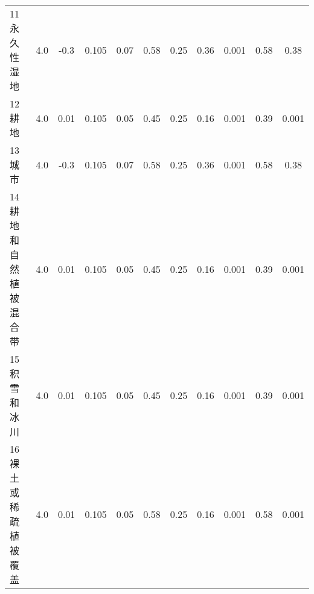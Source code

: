 \begin{landscape}
\begin{table}[htbp]
\begin{tabular}{@{}lcccccccccc@{}}
% 
            11 永久性湿地      & 4.0         & -0.3         & 0.105          & 0.07          & 0.58          & 0.25          & 0.36          & 0.001          & 0.58           & 0.38 \\
            12 耕地         & 4.0          & 0.01          & 0.105          & 0.05          & 0.45          & 0.25          & 0.16          & 0.001          & 0.39          & 0.001         \\
            13 城市         & 4.0          & -0.3          & 0.105          & 0.07          & 0.58          & 0.25          & 0.36          & 0.001          & 0.58          & 0.38          \\
            14 耕地和自然植被混合带 & 4.0          & 0.01          & 0.105          & 0.05          & 0.45          & 0.25          & 0.16          & 0.001          & 0.39          & 0.001         \\
            15 积雪和冰川      & 4.0          & 0.01          & 0.105          & 0.05          & 0.45          & 0.25          & 0.16          & 0.001          & 0.39          & 0.001         \\
            16 裸土或稀疏植被覆盖  & 4.0          & 0.01          & 0.105          & 0.05          & 0.58          & 0.25          & 0.16          & 0.001          & 0.58          & 0.001         \\\bottomrule
        \end{tabular}
\end{table}
\end{landscape}

